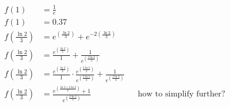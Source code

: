 \documentclass{article}
\begin{document}
\begin{description}
\begin{description}
\begin{align*}
                        f(1)                           & = \frac{1}{e}                                                                                                                                                                                                        \\
                        f(1)                           & = 0.37                                                                                                                                                                                                               \\[2em]
                        f\left(\frac{\ln{2}}{3}\right) & = e^{\left(\frac{\ln{2}}{3}\right)} + e^{-2\left(\frac{\ln{2}}{3}\right)}                                                                                                                                            \\
                        f\left(\frac{\ln{2}}{3}\right) & = \frac{e^{\left(\frac{\ln{2}}{3}\right)}}{1} + \frac{1}{e^{\left(\frac{2\ln{2}}{3}\right)}}                                                                                                                         \\
                        f\left(\frac{\ln{2}}{3}\right) & = \frac{e^{\left(\frac{\ln{2}}{3}\right)}}{1} \cdot \frac{e^{\left(\frac{2\ln{2}}{3}\right)}}{e^{\left(\frac{2\ln{2}}{3}\right)}}+ \frac{1}{e^{\left(\frac{2\ln{2}}{3}\right)}}                                      \\
                        f\left(\frac{\ln{2}}{3}\right) & =  \frac{e^{\left(\frac{\ln{2} + 2\ln{2}}{3}\right)}+ 1}{e^{\left(\frac{2\ln{2}}{3}\right)}}                                                                                    &  & \text{how to simplify further?}
                    \end{align*}
          \end{description}
\end{description}
\end{document}
